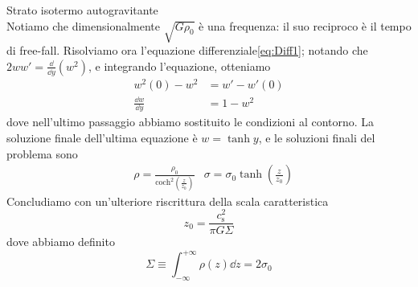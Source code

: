 \begin{Example}{Strato isotermo autogravitante}
\begin{equation}
\end{equation}
Notiamo che dimensionalmente $\sqrt{G\rho_0}$ è una frequenza: il suo reciproco è il tempo di free-fall.
Risolviamo ora l'equazione differenziale\ref{eq:Diff1}; notando che $2ww'=\frac{\dd}{\dd y}(w^2)$, e integrando l'equazione, otteniamo
\begin{align*}
w^2(0)-w^2 &= w'-w'(0) \\
\frac{\dd w}{\dd y} &=1-w^2
\end{align*}
dove nell'ultimo passaggio abbiamo sostituito le condizioni al contorno. La soluzione finale dell'ultima equazione è $w=\tanh y$, e le soluzioni finali del problema sono
\begin{align}
& \rho = \frac{\rho_0}{\mathrm{coch}^2 \left(\frac{z}{z_0} \right)}
& \sigma = \sigma_0 \tanh \left(\frac{z}{z_0} \right)
\end{align}
Concludiamo con un'ulteriore riscrittura della scala caratteristica
\begin{equation}
z_0=\frac{c_\mathrm{s}^2}{\pi G \Sigma}
\end{equation}
dove abbiamo definito 
\begin{equation}
\Sigma \equiv \int_{-\infty}^{+\infty} \rho(z) \dd z = 2\sigma_0
\end{equation}
\end{Example}

